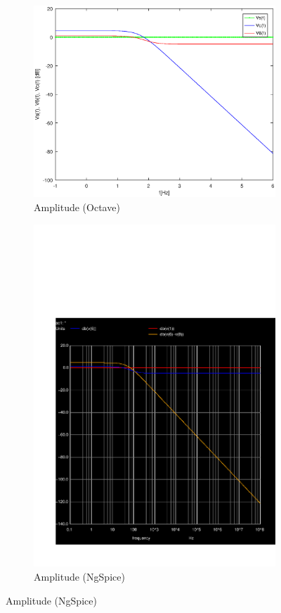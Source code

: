 \begin{figure}[H] 
\centering
\begin{subfigure}{0.4\textwidth}
\includegraphics[width=\textwidth]{Amplitude.eps}
\caption{Amplitude (Octave)}
\label{fig:first}
\end{subfigure}
\begin{subfigure}{0.3\textwidth}
\includegraphics[width=\textwidth]{sim5_db.pdf}
\caption{Amplitude (NgSpice)}
\label{fig:second}
\end{subfigure}
\end{figure}


